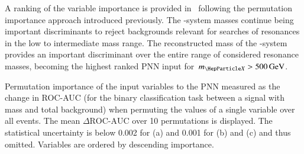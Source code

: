 A ranking of the variable importance is provided
in~ following the permutation importance
approach introduced previously. The \PHiggs-system masses continue
being important discriminants to reject backgrounds relevant for
searches of resonances in the low to intermediate mass range. The
reconstructed mass of the \HH-system provides an important
discriminant over the entire range of considered resonance masses,
becoming the highest ranked PNN input for~$\mX > \SI{500}{\GeV}$.

\begin{table}[htbp]
  \centering

  \caption[Importance of the input variables in the PNN
  discriminant.]{Permutation importance of the input variables to the PNN
    measured as the change in ROC-AUC (for the binary classification task
    between a signal with mass \mX and total background) when permuting the
    values of a single variable over all events. The mean $\Delta\text{ROC-AUC}$
    over 10 permutations is displayed. The statistical uncertainty is below
    0.002 for (a) and 0.001 for (b) and (c) and thus omitted.  Variables are
    ordered by descending importance.}%
  \label{tab:pnn_ranking}

  \begin{subtable}[t]{.33\textwidth}
    \centering
    \renewcommand{\arraystretch}{1.12}
    
  \end{subtable}%
  \begin{subtable}[t]{.33\textwidth}
    \centering
    \renewcommand{\arraystretch}{1.12}
    
  \end{subtable}%
  \begin{subtable}[t]{.33\textwidth}
    \centering
    \renewcommand{\arraystretch}{1.12}
    
  \end{subtable}

\end{table}

